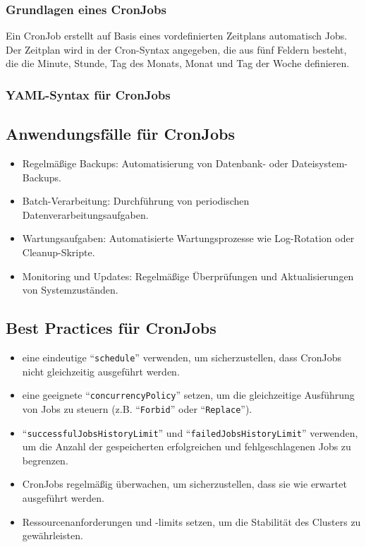 \subsubsection{Grundlagen eines CronJobs}
Ein CronJob erstellt auf Basis eines vordefinierten Zeitplans automatisch Jobs. Der Zeitplan wird in der Cron-Syntax angegeben, die aus fünf Feldern besteht, die die Minute, Stunde, Tag des Monats, Monat und Tag der Woche definieren.
\newpage
\subsubsection{YAML-Syntax für CronJobs}


\subsection{Anwendungsfälle für CronJobs}
\begin{itemize}
    \item Regelmäßige Backups: Automatisierung von Datenbank- oder Dateisystem-Backups.
    \item Batch-Verarbeitung: Durchführung von periodischen Datenverarbeitungsaufgaben.
    \item Wartungsaufgaben: Automatisierte Wartungsprozesse wie Log-Rotation oder Cleanup-Skripte.
    \item Monitoring und Updates: Regelmäßige Überprüfungen und Aktualisierungen von Systemzuständen.
\end{itemize}

\subsection{Best Practices für CronJobs}
\begin{itemize}
    \item eine eindeutige \enquote{\texttt{schedule}} verwenden, um sicherzustellen, dass CronJobs nicht gleichzeitig ausgeführt werden.
    \item eine geeignete \enquote{\texttt{concurrencyPolicy}} setzen, um die gleichzeitige Ausführung von Jobs zu steuern (z.B. \enquote{\texttt{Forbid}} oder \enquote{\texttt{Replace}}).
    \item \enquote{\texttt{successfulJobsHistoryLimit}} und \enquote{\texttt{failedJobsHistoryLimit}} verwenden, um die Anzahl der gespeicherten erfolgreichen und fehlgeschlagenen Jobs zu begrenzen.
    \item CronJobs regelmäßig überwachen, um sicherzustellen, dass sie wie erwartet ausgeführt werden.
    \item Ressourcenanforderungen und -limits setzen, um die Stabilität des Clusters zu gewährleisten.
\end{itemize}

